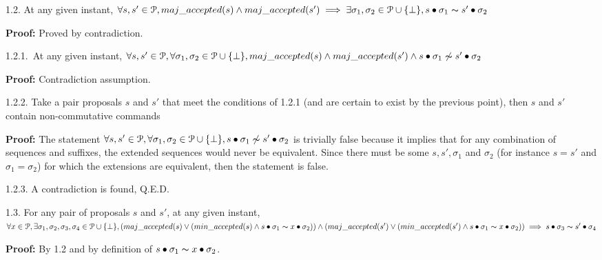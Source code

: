 \indent\indent\indent\parbox{\linewidth-\algorithmicindent*3}{\strut1.2. At any given instant, $\forall s,s' \in \mathcal{P}, maj\_accepted(s) \land maj\_accepted(s') \implies \exists \sigma_1,\sigma_2 \in \mathcal{P} \cup \{\bot\}, s \bullet \sigma_1 \thicksim s' \bullet \sigma_2$}\par
\indent\indent\indent\indent\parbox{\linewidth}{\strut\textbf{Proof:} Proved by contradiction.}\par
\indent\indent\indent\indent\indent\parbox{\linewidth-\algorithmicindent*5}{\strut1.2.1.~At any given instant, $\forall s,s' \in \mathcal{P}, \forall \sigma_1,\sigma_2 \in \mathcal{P} \cup \{\bot \}, maj\_accepted(s) \land maj\_accepted(s') \wedge s \bullet \sigma_1 \not\thicksim s' \bullet \sigma_2$} \par
\indent\indent\indent\indent\indent\indent\parbox{\linewidth}{\strut\textbf{Proof:} Contradiction assumption.}\par
\indent\indent\indent\indent\indent\parbox{\linewidth-\algorithmicindent*5}{\strut1.2.2. Take a pair proposals $s$ and $s'$ that meet the conditions of 1.2.1 (and are certain to exist by the previous point), then $s$ and $s'$ contain non-commutative commands}\par
\indent\indent\indent\indent\indent\indent\parbox{\linewidth-\algorithmicindent*6}{\strut\textbf{Proof:} The statement $\forall s,s' \in \mathcal{P}, \forall \sigma_1,\sigma_2 \in \mathcal{P} \cup \{\bot \}, s \bullet \sigma_1 \not\thicksim s' \bullet \sigma_2$ is trivially false because it implies that for any combination of sequences and suffixes, the extended sequences would never be equivalent. Since there must be some $s,s',\sigma_1$ and $\sigma_2$ (for instance $s=s'$ and $\sigma_1=\sigma_2$) for which the extensions are equivalent, then the statement is false.}\par
\indent\indent\indent\indent\indent\parbox{\linewidth}{\strut1.2.3. A contradiction is found, Q.E.D. }\par
\indent\indent\indent\parbox{\linewidth-\algorithmicindent*3}{\strut1.3. For any pair of proposals $s$ and $s'$, at any given instant, $\forall x \in \mathcal{P}, \exists \sigma_1,\sigma_2,\sigma_3,\sigma_4 \in \mathcal{P} \cup \{\bot\}, (maj\_accepted(s) \lor (min\_accepted(s) \land s \bullet \sigma_1 \thicksim x \bullet \sigma_2)) \land (maj\_accepted(s') \lor (min\_accepted(s') \land s \bullet \sigma_1 \thicksim x \bullet \sigma_2)) \implies s \bullet \sigma_3 \thicksim s' \bullet \sigma_4$}\par
\indent\indent\indent\indent\parbox{\linewidth}{\strut\textbf{Proof:} By 1.2 and by definition of $s \bullet \sigma_1 \thicksim x \bullet \sigma_2$.}\par
